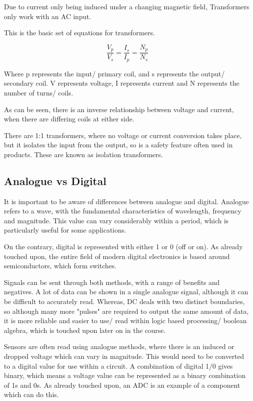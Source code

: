 \documentclass[a4paper,11pt]{report}
\begin{document}
Due to current only being induced under a changing magnetic field, Transformers only work with an AC input.

This is the basic set of equations for transformers.

\[\frac{V_p}{V_s} = \frac{I_s}{I_p} = \frac{N_p}{N_s}\]

Where p represents the input/ primary coil, and s represents the output/ secondary coil. V represents voltage, I represents current and N represents the number of turns/ coils.

As can be seen, there is an inverse relationship between voltage and current, when there are differing coils at either side.

There are 1:1 transformers, where no voltage or current conversion takes place, but it isolates the input from the output, so is a safety feature often used in products. These are known as isolation transformers.

\subsection{Analogue vs Digital}

It is important to be aware of differences between analogue and digital. Analogue refers to a wave, with the fundamental characteristics of wavelength, frequency and magnitude. This value can vary considerably within a period, which is particularly useful for some applications.

On the contrary, digital is represented with either 1 or 0 (off or on). As already touched upon, the entire field of modern digital electronics is based around semiconductors, which form switches.

Signals can be sent through both methods, with a range of benefits and negatives. A lot of data can be shown in a single analogue signal, although it can be difficult to accurately read. Whereas, DC deals with two distinct boundaries, so although many more "pulses" are required to output the same amount of data, it is more reliable and easier to use/ read within logic based processing/ boolean algebra, which is touched upon later on in the course.

Sensors are often read using analogue methods, where there is an induced or dropped voltage which can vary in magnitude. This would need to be converted to a digital value for use within a circuit. A combination of digital 1/0 gives binary, which means a voltage value can be represented as a binary combination of 1s and 0s. As already touched upon, an ADC is an example of a component which can do this.
\end{document}
